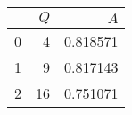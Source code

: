 \begin{tabular}{lrr}
\toprule
{} &  $Q$ &       $A$ \\
\midrule
0 &    4 &  0.818571 \\
1 &    9 &  0.817143 \\
2 &   16 &  0.751071 \\
\bottomrule
\end{tabular}
